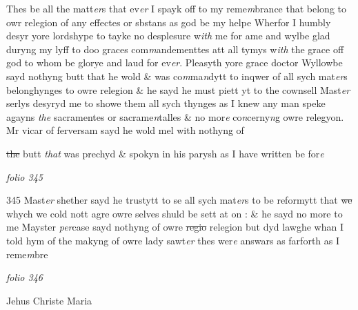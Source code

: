 \documentclass[12pt, a4paper]{book}
\begin{document}
Thes be all the matt\textit{er}s that ev\textit{er} I spayk off to my reme\textit{m}brance that belong to owr relegion of any effectes or sbstans as god be my helpe Wherfor I humbly desyr yore  lordshype to tayke no desplesure w\textit{ith} me for ame and wylbe glad duryng my lyff to doo graces 
			com\textit{m}andementtes att all tymys w\textit{ith} the grace 
			off  god to whom be glorye and laud for ev\textit{er}.  Pleasyth yore grace doctor Wyllowbe sayd nothyng butt that he wold \& was co\textit{m}ma\textit{n}dytt to inqwer of all sych mat\textit{er}s belonghynges to owre relegion  \& he sayd he must piett yt to the cownsell  Mast\textit{er} serlys desyryd me to showe them all sych thynges as I knew any man speke  agayns \textit{the} sacramentes or sacrame\textit{n}talles \& no mor\textit{e} co\textit{n}cerny\textit{n}g owre relegyon.  Mr vicar of ferversam 
			sayd he wold mel with nothyng  of \sout{}
			
               \sout{the }butt \textit{that }was prechyd \& spokyn in his parysh as I have written be for\textit{e}
               
\dotfill
					

\textit{folio 345}


{\color{Mahogany}345} Mast\textit{er} shether sayd he trustytt to 
			se all sych mat\textit{er}s to be reformytt that \sout{we} whych we 
			cold nott 
			agre owre selves shuld be sett at on : \& he sayd no more to me  Mayster \textit{per}case sayd nothyng of owre \sout{regio }relegion but dyd lawghe whan  I told hym of the makyng of owre  lady sawt\textit{er} thes wer\textit{e} answars as farforth as I reme\textit{m}bre

\dotfill
					

\textit{folio 346}


Jehus Christe Maria

\dotfill
					  \section*{}  \subsection*{}
\end{document}
